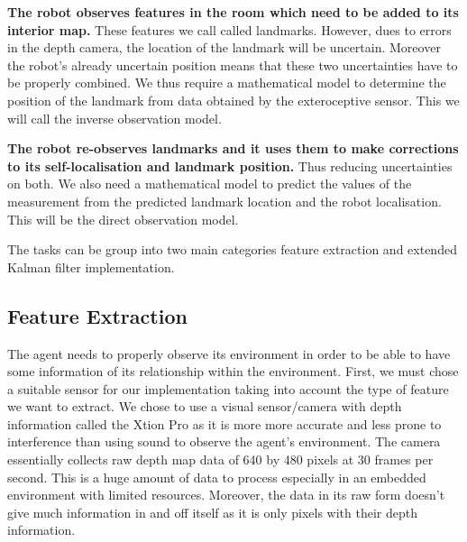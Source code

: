 \documentclass[]{article}
\begin{document}
{\textbf{The robot observes features in the room which need to be added to its interior map.} These features we call called landmarks. However, dues to errors in the depth camera, the location of the landmark will be uncertain. Moreover the robot's already uncertain position means that these two uncertainties have to be properly combined. We thus require a mathematical model to determine the position of the landmark from data obtained by the exteroceptive sensor. This we will call the inverse observation model.

\textbf{The robot re-observes landmarks and it uses them to  make corrections to its self-localisation and landmark position.} Thus reducing uncertainties on both. We also need a mathematical model to predict the values of the measurement from the predicted landmark location and the robot localisation. This will be the direct observation model.

The tasks can be group into two main categories feature extraction and extended Kalman filter implementation.

\subsection{Feature Extraction}
The agent needs to properly observe its environment in order to be able to have some information of its relationship within the environment. First, we must chose a suitable sensor for our implementation taking into account the type of feature we want to extract. We chose to use a visual sensor/camera with depth information called the Xtion Pro as it is more more accurate and less prone to interference than using sound to observe the agent's environment. The camera essentially collects raw depth map data of 640 by 480 pixels at 30 frames per second. This is a huge amount of data to process especially in an embedded environment with limited resources. Moreover, the data in its raw form doesn't give much information in and off itself as it is only pixels with their depth information.

}
\end{document}

